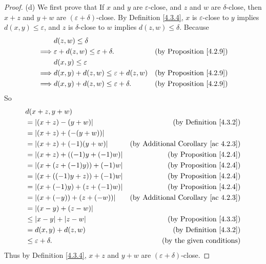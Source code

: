 \begin{proof}{(d)}
We first prove that If \(x\) and \(y\) are \(\varepsilon\)-close, and \(z\) and \(w\) are \(\delta\)-close, then \(x + z\) and \(y + w\) are \((\varepsilon + \delta)\)-close.
By Definition \ref{4.3.4}, \(x\) is \(\varepsilon\)-close to \(y\) implies \(d(x, y) \leq \varepsilon\), and \(z\) is \(\delta\)-close to \(w\) implies \(d(z, w) \leq \delta\).
Because
\begin{align*}
& d(z, w) \leq \delta \\
\implies & \varepsilon + d(z, w) \leq \varepsilon + \delta. & \text{(by Proposition \ref{4.2.9})} \\
& d(x, y) \leq \varepsilon \\
\implies & d(x, y) + d(z, w) \leq \varepsilon + d(z, w) & \text{(by Proposition \ref{4.2.9})} \\
\implies & d(x, y) + d(z, w) \leq \varepsilon + \delta. & \text{(by Proposition \ref{4.2.9})}
\end{align*}
So
\begin{align*}
& d(x + z, y + w) \\
&= \abs*{(x + z) - (y + w)} & \text{(by Definition \ref{4.3.2})} \\
&= \abs*{(x + z) + (-(y + w))} \\
&= \abs*{(x + z) + (-1)(y + w)} & \text{(by Additional Corollary \ref{ac 4.2.3})} \\
&= \abs*{(x + z) + ((-1)y + (-1)w)} & \text{(by Proposition \ref{4.2.4})} \\
&= \abs*{(x + (z + (-1)y)) + (-1)w} & \text{(by Proposition \ref{4.2.4})} \\
&= \abs*{(x + ((-1)y + z)) + (-1)w} & \text{(by Proposition \ref{4.2.4})} \\
&= \abs*{(x + (-1)y) + (z + (-1)w)} & \text{(by Proposition \ref{4.2.4})} \\
&= \abs*{(x + (-y)) + (z + (-w))} & \text{(by Additional Corollary \ref{ac 4.2.3})} \\
&= \abs*{(x - y) + (z - w)} \\
&\leq \abs*{x - y} + \abs*{z - w} & \text{(by Proposition \ref{4.3.3})} \\
&= d(x, y) + d(z, w) & \text{(by Definition \ref{4.3.2})} \\
&\leq \varepsilon + \delta. & \text{(by the given conditions)}
\end{align*}
Thus by Definition \ref{4.3.4}, \(x + z\) and \(y + w\) are \((\varepsilon + \delta)\)-close.


\end{proof}
